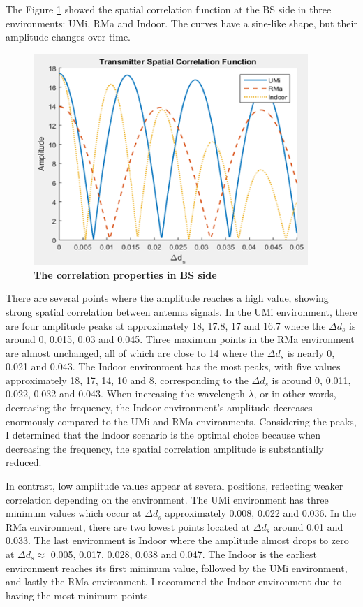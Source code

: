 \documentclass{article} %
\begin{document}
The Figure \ref{figure2} showed the spatial correlation function at the BS side in three environments: UMi, RMa and Indoor. The curves have a sine-like shape, but their amplitude changes over time.

\begin{figure}[!ht]
    \centering
    \includegraphics[height=8cm]{Images/figure2.png}
    \caption[The correlation properties in BS side~\cite{final_exam}]{\bfseries \fontsize{12pt}{0pt}\selectfont The correlation properties in BS side~\cite{final_exam}}
    \label{figure2}
\end{figure}

There are several points where the amplitude reaches a high value, showing strong spatial correlation between antenna signals. In the UMi environment, there are four amplitude peaks at approximately 18, 17.8, 17 and 16.7 where the $\Delta d_s$ is around 0, 0.015, 0.03 and 0.045. Three maximum points in the RMa environment are almost unchanged, all of which are close to 14 where the $\Delta d_s$ is nearly 0, 0.021 and 0.043. The Indoor environment has the most peaks, with five values approximately 18, 17, 14, 10 and 8, corresponding to the $\Delta d_s$ is around 0, 0.011, 0.022, 0.032 and 0.043. When increasing the wavelength $\lambda$, or in other words, decreasing the frequency, the Indoor environment’s amplitude decreases enormously compared to the UMi and RMa environments. Considering the peaks, I determined that the Indoor scenario is the optimal choice because when decreasing the frequency, the spatial correlation amplitude is substantially reduced.

In contrast, low amplitude values appear at several positions, reflecting weaker correlation depending on the environment. The UMi environment has three minimum values which occur at $\Delta d_s$ approximately 0.008, 0.022 and 0.036. In the RMa environment, there are two lowest points located at $\Delta d_s$ around 0.01 and 0.033. The last environment is Indoor where the amplitude almost drops to zero at $\Delta d_s \approx$ 0.005, 0.017, 0.028, 0.038 and 0.047. The Indoor is the earliest environment reaches its first minimum value, followed by the UMi environment, and lastly the RMa environment. I recommend the Indoor environment due to having the most minimum points.
\end{document}
